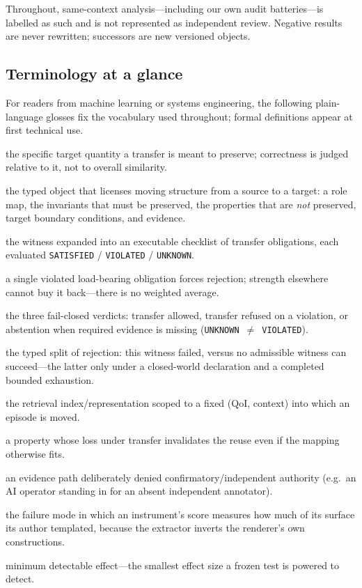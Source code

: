 \begin{enumerate}[leftmargin=*]
\end{enumerate}

Throughout, same-context analysis---including our own audit batteries---is labelled as such and is not represented as independent review. Negative results are never rewritten; successors are new versioned objects.

\subsection{Terminology at a glance}

For readers from machine learning or systems engineering, the following plain-language glosses fix the vocabulary used throughout; formal definitions appear at first technical use.

\begin{description}[leftmargin=1.4em,style=nextline]
\item[Quantity of interest (QoI)] the specific target quantity a transfer is meant to preserve; correctness is judged relative to it, not to overall similarity.
\item[Directional structural witness] the typed object that licenses moving structure from a source to a target: a role map, the invariants that must be preserved, the properties that are \emph{not} preserved, target boundary conditions, and evidence.
\item[Obligation set] the witness expanded into an executable checklist of transfer obligations, each evaluated \texttt{SATISFIED} / \texttt{VIOLATED} / \texttt{UNKNOWN}.
\item[Non-compensatory] a single violated load-bearing obligation forces rejection; strength elsewhere cannot buy it back---there is no weighted average.
\item[\texttt{LICENSED} / \texttt{REJECTED} / \texttt{CANNOT\_CHECK}] the three fail-closed verdicts: transfer allowed, transfer refused on a violation, or abstention when required evidence is missing (\texttt{UNKNOWN}~$\neq$~\texttt{VIOLATED}).
\item[\texttt{MERELY\_UNLICENSED} / \texttt{CERTIFIABLY\_IMPOSSIBLE}] the typed split of rejection: this witness failed, versus no admissible witness can succeed---the latter only under a closed-world declaration and a completed bounded exhaustion.
\item[Fibre] the retrieval index/representation scoped to a fixed (QoI, context) into which an episode is moved.
\item[Forbidden loss] a property whose loss under transfer invalidates the reuse even if the mapping otherwise fits.
\item[Demoted evidence] an evidence path deliberately denied confirmatory/independent authority (e.g.\ an AI operator standing in for an absent independent annotator).
\item[Template inversion] the failure mode in which an instrument's score measures how much of its surface its author templated, because the extractor inverts the renderer's own constructions.
\item[MDE] minimum detectable effect---the smallest effect size a frozen test is powered to detect.
\end{description}
